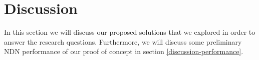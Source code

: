 \section{Discussion}\label{disc}




    
In this section we will discuss our proposed solutions that we explored in order to answer the research questions. Furthermore, we will discuss some preliminary NDN performance of our proof of concept in section \ref{discussion-performance}.

